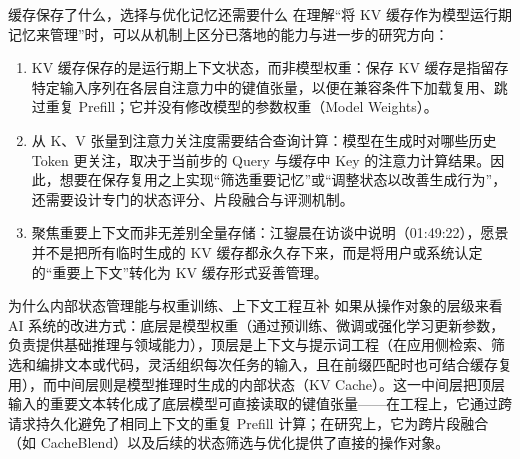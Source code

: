 \documentclass[UTF8,a4paper,11pt,fontset=fandol]{ctexart}
\begin{document}
\begin{warningbox}{缓存保存了什么，选择与优化记忆还需要什么}
在理解“将 KV 缓存作为模型运行期记忆来管理”时，可以从机制上区分已落地的能力与进一步的研究方向：
\begin{enumerate}
\item KV 缓存保存的是运行期上下文状态，而非模型权重：保存 KV 缓存是指留存特定输入序列在各层自注意力中的键值张量，以便在兼容条件下加载复用、跳过重复 Prefill；它并没有修改模型的参数权重（Model Weights）。
\item 从 K、V 张量到注意力关注度需要结合查询计算：模型在生成时对哪些历史 Token 更关注，取决于当前步的 Query 与缓存中 Key 的注意力计算结果。因此，想要在保存复用之上实现“筛选重要记忆”或“调整状态以改善生成行为”，还需要设计专门的状态评分、片段融合与评测机制。
\item 聚焦重要上下文而非无差别全量存储：江鋆晨在访谈中说明（01:49:22），愿景并不是把所有临时生成的 KV 缓存都永久存下来，而是将用户或系统认定的“重要上下文”转化为 KV 缓存形式妥善管理。
\end{enumerate}
\end{warningbox}
\begin{importantbox}{为什么内部状态管理能与权重训练、上下文工程互补}
如果从操作对象的层级来看 AI 系统的改进方式：底层是模型权重（通过预训练、微调或强化学习更新参数，负责提供基础推理与领域能力），顶层是上下文与提示词工程（在应用侧检索、筛选和编排文本或代码，灵活组织每次任务的输入，且在前缀匹配时也可结合缓存复用），而中间层则是模型推理时生成的内部状态（KV Cache）。这一中间层把顶层输入的重要文本转化成了底层模型可直接读取的键值张量——在工程上，它通过跨请求持久化避免了相同上下文的重复 Prefill 计算；在研究上，它为跨片段融合（如 CacheBlend）以及后续的状态筛选与优化提供了直接的操作对象。
\end{importantbox}
\end{document}
